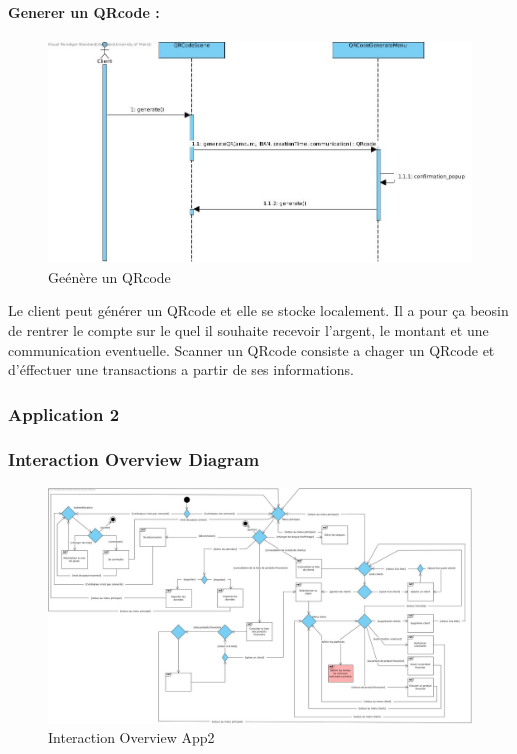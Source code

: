 \documentclass[../rapport.tex]{subfiles}
\begin{document}
			\paragraph{Generer un QRcode :}
						\begin{figure}[h!]
								\centering\includegraphics[scale=0.3]{ressources/photos_diagrammes/extensionChristian/interactionapp1/Generer_un_code_QR.jpg}
								\caption{ Geénère un QRcode}
						\end{figure}
					Le client peut générer un QRcode et elle se stocke localement. Il a pour ça beosin de rentrer le compte sur le quel il souhaite recevoir l'argent,
                    le montant et une communication eventuelle.
					\medskip
					Scanner un QRcode consiste a chager un QRcode et d'éffectuer une transactions a partir de ses informations.	
\newpage		
		\subsubsection{Application 2}
        
		\subsubsection{Interaction Overview Diagram}
        \begin{figure}[h!]

                \centering\includegraphics[scale=0.3]{ressources/photos_diagrammes/extensionChristian/interactionapp2/InteractionOverviewDiagram.jpg}
		        \caption{ Interaction Overview App2}
        \end{figure}
\end{document}
